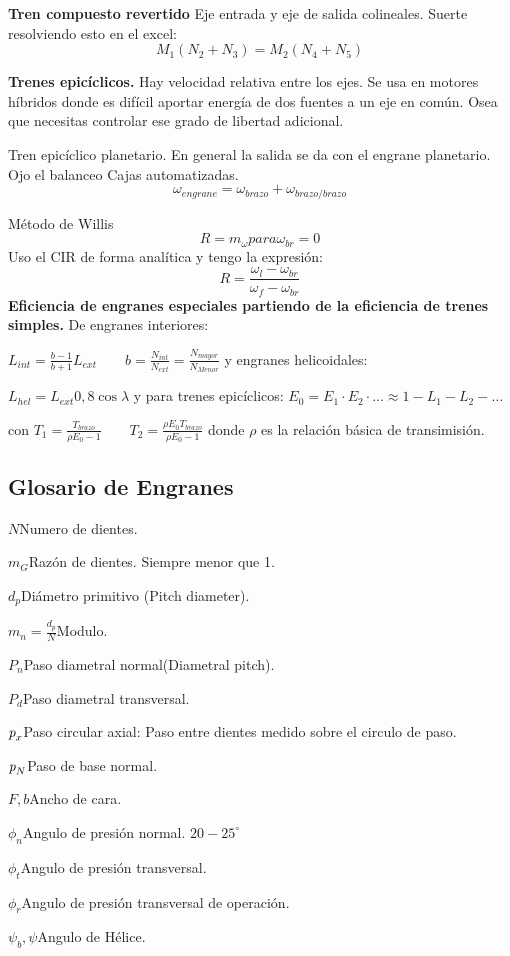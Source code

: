 \documentclass[twocolumn,10pt]{article}
\newcommand{\glossentry}[2]{$#1$\indent #2 \par \vspace{.4cm} } %
\newcommand{\pe}{\textit{\textrm{p}}}
\begin{document}
{\bf Tren compuesto revertido} Eje entrada y eje de salida colineales. Suerte resolviendo esto en el excel:
\[
M_1 (N_2+N_3)=M_2 (N_4 + N_5)
\]

{\bf Trenes epicíclicos.} Hay velocidad relativa entre los ejes. Se usa en motores híbridos donde es difícil aportar energía de dos fuentes a un eje en común. Osea que necesitas controlar ese grado de libertad adicional.

Tren epicíclico planetario. En general la salida se da con el engrane planetario.
{\sc Ojo el balanceo}
Cajas automatizadas.
\[
\omega_{engrane}=\omega_{brazo}+\omega_{brazo/brazo}
\]

Método de Willis
\[
R=m_\omega para \omega_{br} = 0
\]
Uso el CIR de forma analítica y tengo la expresión:
\[R=\frac{\omega_l - \omega_{br}}{\omega_f - \omega_{br}}
\]
{\bf Eficiencia de engranes especiales partiendo de la eficiencia de trenes simples.} De engranes interiores:

$L_{int}=\frac{b-1}{b+1}L_{ext}\qquad b=\frac{N_{int}}{N_{ext}}=\frac{N_{mayor}}{N_{Menor}}$
y engranes helicoidales:

$L_{hel}=L_{ext} 0,8 \cos \lambda $
y para trenes epicíclicos:
$E_0 = E_1\cdot E_2 \cdot \ldots \approx 1-L_1 -L_2 - \ldots $

con $T_1=\frac{T_{brazo}}{\rho E_0 -1}\qquad T_2 =\frac{\rho E_0 T_{brazo}}{\rho E_0 -1}$ donde $\rho$ es la relación básica de transimisión. 

\subsection*{Glosario de Engranes}
\glossentry{N}{Numero de dientes.}
\glossentry{m_G}{Razón de dientes. Siempre menor que 1.}
\glossentry{d_p}{Diámetro primitivo (Pitch diameter).}
\glossentry{m_n=\frac{d_p}{N}}{Modulo.}
\glossentry{P_n}{Paso diametral normal(Diametral pitch).}
\glossentry{P_d}{Paso diametral transversal.}

\glossentry{\pe_x}{Paso circular axial: Paso entre dientes medido sobre el circulo de paso.}
\glossentry{\pe_N}{Paso de base normal.}
\glossentry{F,b}{Ancho de cara.}
\glossentry{\phi_n}{Angulo de presión normal. $20-25^\circ$}
\glossentry{\phi_t}{Angulo de presión transversal.}
\glossentry{\phi_r}{Angulo de presión transversal de operación.}
\glossentry{\psi_b,\psi}{Angulo de Hélice.}

\end{document}

